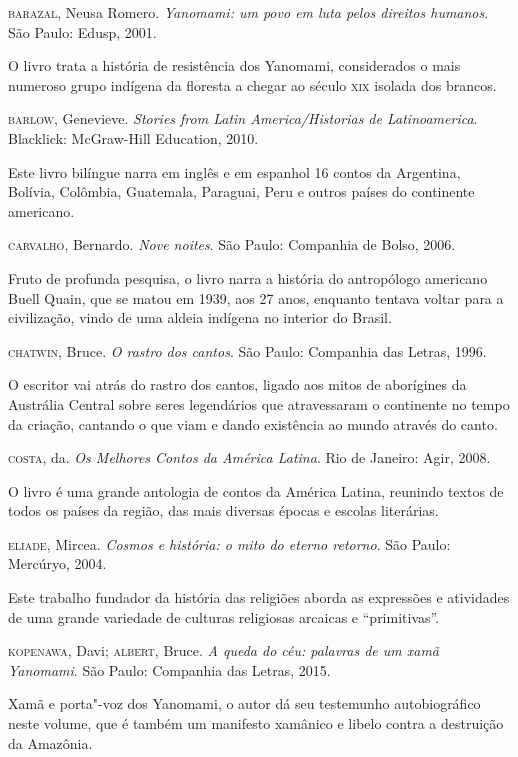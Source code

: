 \documentclass[12pt]{extarticle}
\begin{document}
\textsc{barazal}, Neusa Romero. \textit{Yanomami: um povo em luta pelos direitos
humanos}. São Paulo: Edusp, 2001.

O livro trata a história de resistência dos Yanomami, considerados
o mais numeroso grupo indígena da floresta a chegar ao século \textsc{xix} isolada
dos brancos.

\textsc{barlow}, Genevieve. \textit{Stories from Latin America/Historias de
Latinoamerica}. Blacklick: McGraw-Hill Education, 2010.

Este livro bilíngue narra em inglês e em espanhol 16 contos da
Argentina, Bolívia, Colômbia, Guatemala, Paraguai, Peru e outros países
do continente americano.

\textsc{carvalho}, Bernardo. \textit{Nove noites}. São Paulo: Companhia de Bolso,
2006.

Fruto de profunda pesquisa, o livro narra a história do antropólogo
americano Buell Quain, que se matou em 1939, aos 27 anos, enquanto
tentava voltar para a civilização, vindo de uma aldeia indígena no
interior do Brasil.

\textsc{chatwin}, Bruce. \textit{O rastro dos cantos}. São Paulo: Companhia das
Letras, 1996.

O escritor vai atrás do rastro dos cantos, ligado aos mitos de
aborígines da Austrália Central sobre seres legendários que atravessaram
o continente no tempo da criação, cantando o que viam e dando existência
ao mundo através do canto.

\textsc{costa}, da. \textit{Os Melhores Contos da América Latina}. Rio de Janeiro: Agir,
2008.

O livro é uma grande antologia de contos da América Latina, reunindo
textos de todos os países da região, das mais diversas épocas e escolas
literárias.

\textsc{eliade}, Mircea. \textit{Cosmos e história: o mito do eterno retorno}. São
Paulo: Mercúryo, 2004.

Este trabalho fundador da história das religiões aborda as expressões e
atividades de uma grande variedade de culturas religiosas arcaicas e
``primitivas''.

\textsc{kopenawa}, Davi; \textsc{albert}, Bruce. \textit{A queda do céu: palavras de um
xamã Yanomami}. São Paulo: Companhia das Letras, 2015.

Xamã e porta"-voz dos Yanomami, o autor dá seu testemunho autobiográfico
neste volume, que é também um manifesto xamânico e libelo contra a
destruição da Amazônia.
\end{document}
